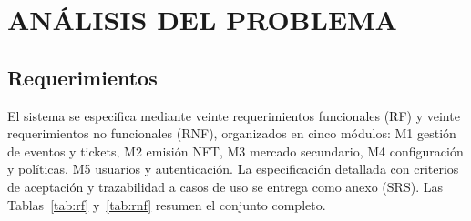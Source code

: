 \newpage
\setcounter{subsection}{0}
\section{ANÁLISIS DEL PROBLEMA}

\subsection{Requerimientos}

El sistema se especifica mediante veinte requerimientos funcionales (RF) y veinte requerimientos no
funcionales (RNF), organizados en cinco módulos: M1 gestión de eventos y tickets, M2 emisión NFT, M3 mercado
secundario, M4 configuración y políticas, M5 usuarios y autenticación. La especificación detallada con
criterios de aceptación y trazabilidad a casos de uso se entrega como anexo (SRS). Las Tablas~\ref{tab:rf}
y~\ref{tab:rnf} resumen el conjunto completo.

